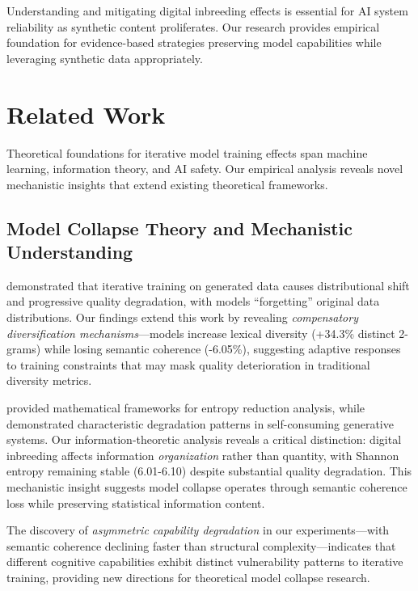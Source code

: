 \documentclass{article}
\begin{document}
Understanding and mitigating digital inbreeding effects is essential for AI system reliability as synthetic content proliferates. Our research provides empirical foundation for evidence-based strategies preserving model capabilities while leveraging synthetic data appropriately.

\section{Related Work}

Theoretical foundations for iterative model training effects span machine learning, information theory, and AI safety. Our empirical analysis reveals novel mechanistic insights that extend existing theoretical frameworks.

\subsection{Model Collapse Theory and Mechanistic Understanding}

\citet{shumailov2023curse} demonstrated that iterative training on generated data causes distributional shift and progressive quality degradation, with models ``forgetting'' original data distributions. Our findings extend this work by revealing \textit{compensatory diversification mechanisms}—models increase lexical diversity (+34.3\% distinct 2-grams) while losing semantic coherence (-6.05\%), suggesting adaptive responses to training constraints that may mask quality deterioration in traditional diversity metrics.

\citet{seddik2024bad} provided mathematical frameworks for entropy reduction analysis, while \citet{alemohammad2023self} demonstrated characteristic degradation patterns in self-consuming generative systems. Our information-theoretic analysis reveals a critical distinction: digital inbreeding affects information \textit{organization} rather than quantity, with Shannon entropy remaining stable (6.01-6.10) despite substantial quality degradation. This mechanistic insight suggests model collapse operates through semantic coherence loss while preserving statistical information content.

The discovery of \textit{asymmetric capability degradation} in our experiments—with semantic coherence declining faster than structural complexity—indicates that different cognitive capabilities exhibit distinct vulnerability patterns to iterative training, providing new directions for theoretical model collapse research.
\end{document}
